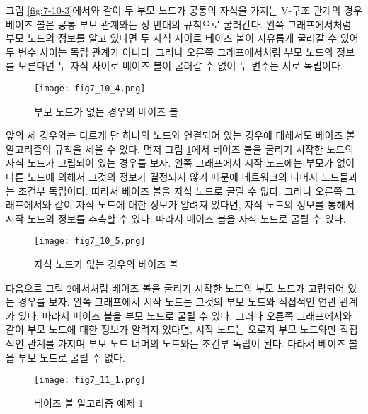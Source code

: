 \documentclass[a4paper]{oblivoir}
\begin{document}
그림 \ref{fig:7-10-3}에서와 같이 두 부모 노드가 공통의 자식을 가지는 V-구조 관계의 경우 베이즈 볼은 공통 부모 관계와는 정 반대의 규칙으로 굴러간다. 왼쪽 그래프에서처럼 부모 노드의 정보를 알고 있다면 두 자식 사이로 베이즈 볼이 자유롭게 굴러갈 수 있어 두 변수 사이는 독립 관계가 아니다. 그러나 오른쪽 그래프에서처럼 부모 노드의 정보를 모른다면 두 자식 사이로 베이즈 볼이 굴러갈 수 없어 두 변수는 서로 독립이다. \\ 

\begin{figure}[ht] \centering 
\texttt{[image: fig7\_10\_4.png]} 
\caption{부모 노드가 없는 경우의 베이즈 볼}
\label{fig:7-10-4}
\end{figure} 

{\color{red} 앞의 세 경우와는 다르게 단 하나의 노드와 연결되어 있는 경우에 대해서도 베이즈 볼 알고리즘의 규칙을 세울 수 있다. 먼저 그림 \ref{fig:7-10-4}에서 베이즈 볼을 굴리기 시작한 노드의 자식 노드가 고립되어 있는 경우를 보자. 왼쪽 그래프에서 시작 노드에는 부모가 없어 다른 노드에 의해서 그것의 정보가 결정되지 않기 때문에 네트워크의 나머지 노드들과는 조건부 독립이다. 따라서 베이즈 볼을 자식 노드로 굴릴 수 없다. 그러나 오른쪽 그래프에서와 같이 자식 노드에 대한 정보가 알려져 있다면, 자식 노드의 정보를 통해서 시작 노드의 정보를 추측할 수 있다. 따라서 베이즈 볼을 자식 노드로 굴릴 수 있다.} \\

\begin{figure}[ht] \centering 
\texttt{[image: fig7\_10\_5.png]} 
\caption{자식 노드가 없는 경우의 베이즈 볼}
\label{fig:7-10-5}
\end{figure} 

{\color{red}  다음으로 그림 \ref{fig:7-10-5}에서처럼 베이즈 볼을 굴리기 시작한 노드의 부모 노드가 고립되어 있는 경우를 보자. 왼쪽 그래프에서 시작 노드는 그것의 부모 노드와 직접적인 연관 관계가 있다. 따라서 베이즈 볼을 부모 노드로 굴릴 수 있다. 그러나 오른쪽 그래프에서와 같이 부모 노드에 대한 정보가 알려져 있다면, 시작 노드는 오로지 부모 노드와만 직접적인 관계를 가지며 부모 노드 너머의 노드와는 조건부 독립이 된다. 다라서 베이즈 볼을 부모 노드로 굴릴 수 없다.} \\

\begin{figure}[ht] \centering 
\texttt{[image: fig7\_11\_1.png]} 
\caption{베이즈 볼 알고리즘 예제 1}
\label{fig:7-11-1}
\end{figure} 
\end{document}
